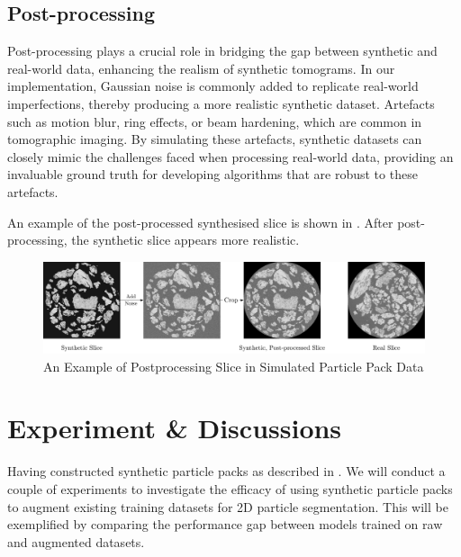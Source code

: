 \documentclass[preprint,12pt]{elsarticle}
\begin{document}
\subsection{Post-processing}
Post-processing plays a crucial role in bridging the gap between synthetic and real-world data, enhancing the realism of synthetic tomograms. 
In our implementation, Gaussian noise is commonly added to replicate real-world imperfections, thereby producing a more realistic synthetic dataset.
Artefacts such as motion blur, ring effects, or beam hardening, which are common in tomographic imaging. 
By simulating these artefacts, synthetic datasets can closely mimic the challenges faced when processing real-world data, providing an invaluable ground truth for developing algorithms that are robust to these artefacts.
\par
An example of the post-processed synthesised slice is shown in . 
After post-processing, the synthetic slice appears more realistic.
\begin{figure}[H]
    \includegraphics[width=\textwidth]{figures/pdf/postprocess.pdf}
    \caption{An Example of Postprocessing Slice in Simulated Particle Pack Data}
    \label{fig:syn:postprocess}
\end{figure}

\section{Experiment \& Discussions}

Having constructed synthetic particle packs as described in . 
We will conduct a couple of experiments to investigate the efficacy of using synthetic particle packs to augment existing training datasets for 2D particle segmentation.
This will be exemplified by comparing the performance gap between models trained on raw and augmented datasets.
\end{document}
